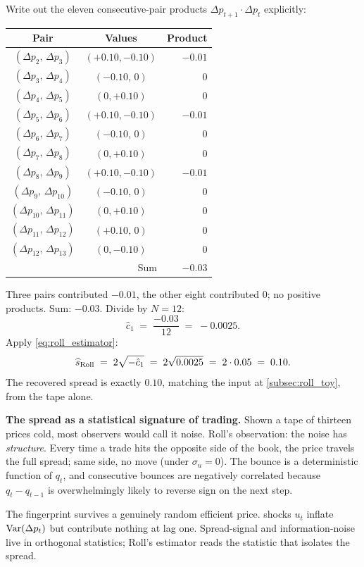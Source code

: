 Write out the eleven consecutive-pair products $\Delta p_{t+1}
\cdot \Delta p_t$ explicitly:
\begin{center}
\begin{tabular}{ccr}
\toprule
Pair                         & Values            & Product \\
\midrule
$(\Delta p_2,\,\Delta p_3)$  & $(+0.10,-0.10)$   & $-0.01$ \\
$(\Delta p_3,\,\Delta p_4)$  & $(-0.10,\,0)$     & $\phantom{-}0$    \\
$(\Delta p_4,\,\Delta p_5)$  & $(0,+0.10)$       & $\phantom{-}0$    \\
$(\Delta p_5,\,\Delta p_6)$  & $(+0.10,-0.10)$   & $-0.01$ \\
$(\Delta p_6,\,\Delta p_7)$  & $(-0.10,\,0)$     & $\phantom{-}0$    \\
$(\Delta p_7,\,\Delta p_8)$  & $(0,+0.10)$       & $\phantom{-}0$    \\
$(\Delta p_8,\,\Delta p_9)$  & $(+0.10,-0.10)$   & $-0.01$ \\
$(\Delta p_9,\,\Delta p_{10})$ & $(-0.10,\,0)$   & $\phantom{-}0$    \\
$(\Delta p_{10},\,\Delta p_{11})$ & $(0,+0.10)$  & $\phantom{-}0$    \\
$(\Delta p_{11},\,\Delta p_{12})$ & $(+0.10,\,0)$ & $\phantom{-}0$    \\
$(\Delta p_{12},\,\Delta p_{13})$ & $(0,-0.10)$   & $\phantom{-}0$    \\
\midrule
\multicolumn{2}{r}{Sum}                          & $-0.03$ \\
\bottomrule
\end{tabular}
\end{center}
Three pairs contributed $-0.01$, the other eight contributed $0$;
no positive products. Sum: $-0.03$. Divide by $N = 12$:
\[
  \hat c_1 \;=\; \frac{-0.03}{12} \;=\; -0.0025.
\]
Apply \cref{eq:roll_estimator}:
\[
  \widehat{s}_{\mathrm{Roll}}
  \;=\; 2 \sqrt{-\hat c_1}
  \;=\; 2 \sqrt{0.0025}
  \;=\; 2 \cdot 0.05
  \;=\; 0.10.
\]
The recovered spread is exactly $0.10$, matching the input at
\cref{subsec:roll_toy}, from the tape alone.

\begin{intuitionbox}
\textbf{The spread as a statistical signature of trading.}
Shown a tape of thirteen prices cold, most observers would call it
noise. Roll's observation: the noise has \emph{structure}. Every
time a trade hits the opposite side of the book, the price travels
the full spread; same side, no move (under $\sigma_u = 0$). The
bounce is a deterministic function of $q_t$, and consecutive
bounces are negatively correlated because $q_t - q_{t-1}$ is
overwhelmingly likely to reverse sign on the next step.

The fingerprint survives a genuinely random efficient price.
\iid{} shocks $u_t$ inflate $\operatorname{Var}(\Delta p_t)$ but contribute
nothing at lag one. Spread-signal and information-noise live in
orthogonal statistics; Roll's estimator reads the statistic that
isolates the spread.
\end{intuitionbox}

